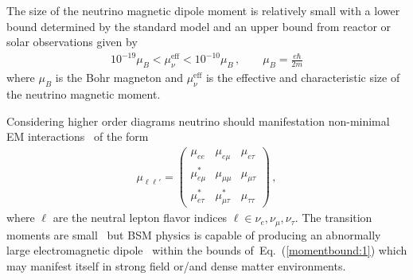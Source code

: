 \documentclass[addchapnum]{ws-rv961x669} %
\newcommand{\req}[1]{Eq.~(\ref{#1})}
\begin{document}
The size of the neutrino magnetic dipole moment is relatively small with a lower bound determined by the standard model and an upper bound from reactor or solar observations given by~\citep{Studenikin:2016ykv,Canas:2015yoa,AristizabalSierra:2021fuc}
\begin{align}
    \label{momentbound:1}
    10^{-19}\mu_{B}<\mu_{\nu}^\mathrm{eff}<10^{-10}\mu_{B}\,,\qquad\mu_{B}=\frac{e\hbar}{2m}
\end{align}
where $\mu_{B}$ is the Bohr magneton and $\mu_{\nu}^\mathrm{eff}$ is the effective and characteristic size of the neutrino magnetic moment.

Considering higher order diagrams neutrino should manifestation non-minimal EM interactions~\citep{Shrock:1980vy} of the form
\begin{align}
    \label{mu:1}
    \mu_{\ell\ell'}=
	\begin{pmatrix}
		\mu_{ee} & \mu_{e\mu} & \mu_{e\tau} \\
		\mu_{e\mu}^{*} & \mu_{\mu\mu} & \mu_{\mu\tau} \\
		\mu_{e\tau}^{*} & \mu_{\mu\tau}^{*} & \mu_{\tau\tau}
	\end{pmatrix}\,,
\end{align}
where $\ell$ are the neutral lepton flavor indices $\ell\in\nu_{e},\nu_{\mu},\nu_{\tau}$. The transition moments are small~\cite{Shrock:1980vy} but BSM physics is capable of producing an abnormally large electromagnetic dipole~\citep{Lindner:2017uvt,Brdar:2020quo} within the bounds of~\req{momentbound:1} which may manifest itself in strong field or/and dense matter environments.

\end{document}
